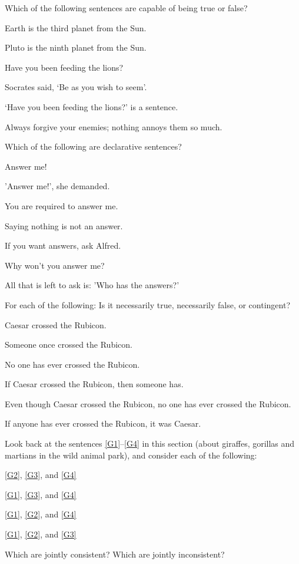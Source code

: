 \practiceproblems
\problempart Which of the following sentences are capable of being true or false?
\begin{earg}
	\item Earth is the third planet from the Sun.
	\item Pluto is the ninth planet from the Sun.
	\item Have you been feeding the lions?
	\item Socrates said, `Be as you wish to seem'.
	\item `Have you been feeding the lions?' is a sentence.
	\item Always forgive your enemies; nothing annoys them so much.
\end{earg}

\problempart Which of the following are declarative sentences?
\begin{earg}
	\item Answer me!
	\item 'Answer me!', she demanded.
	\item You are required to answer me.
	\item Saying nothing is not an answer.
	\item If you want answers, ask Alfred.
	\item Why won't you answer me?
	\item All that is left to ask is: 'Who has the answers?'
\end{earg}

\problempart
\label{pr.EnglishTautology}
For each of the following: Is it necessarily true, necessarily false, or contingent?
\begin{earg}
\item Caesar crossed the Rubicon.
\item Someone once crossed the Rubicon.
\item No one has ever crossed the Rubicon.
\item If Caesar crossed the Rubicon, then someone has.
\item Even though Caesar crossed the Rubicon, no one has ever crossed the Rubicon.
\item If anyone has ever crossed the Rubicon, it was Caesar.
\end{earg}

\problempart
\label{pr.MartianGiraffes}
Look back at the sentences \ref{G1}–\ref{G4} in this section (about giraffes, gorillas and martians in the wild animal park), and consider each of the following:
\begin{earg}
\item \ref{G2}, \ref{G3}, and \ref{G4}
\item \ref{G1}, \ref{G3}, and \ref{G4}
\item \ref{G1}, \ref{G2}, and \ref{G4}
\item \ref{G1}, \ref{G2}, and \ref{G3}
\end{earg}
Which are jointly consistent? Which are jointly inconsistent? 

